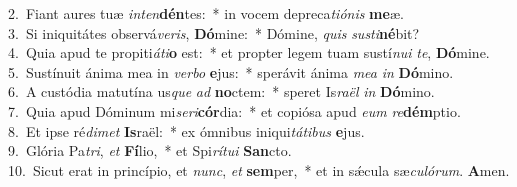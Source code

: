 {2.~}Fiant aures tuæ \textit{in}\textit{ten}\textbf{dén}tes:~* in vocem depreca\textit{ti}\textit{ó}\textit{nis} \textbf{me}æ.\\
{3.~}Si iniquitátes observá\textit{ve}\textit{ris}, \textbf{Dó}mine:~* Dómine, \textit{quis} \textit{su}\textit{sti}\textbf{né}bit?\\
{4.~}Quia apud te propiti\textit{á}\textit{ti}\textbf{o} est:~* et propter legem tuam sustí\textit{nu}\textit{i} \textit{te}, \textbf{Dó}mine.\\
{5.~}Sustínuit ánima mea in \textit{ver}\textit{bo} \textbf{e}jus:~* sperávit ánima \textit{me}\textit{a} \textit{in} \textbf{Dó}mino.\\
{6.~}A custódia matutína us\textit{que} \textit{ad} \textbf{no}ctem:~* speret Is\textit{ra}\textit{ël} \textit{in} \textbf{Dó}mino.\\
{7.~}Quia apud Dóminum mi\textit{se}\textit{ri}\textbf{cór}dia:~* et copiósa apud \textit{e}\textit{um} \textit{re}\textbf{dém}ptio.\\
{8.~}Et ipse ré\textit{di}\textit{met} \textbf{Is}raël:~* ex ómnibus iniqui\textit{tá}\textit{ti}\textit{bus} \textbf{e}jus.\\
{9.~}Glória Pa\textit{tri}, \textit{et} \textbf{Fí}lio,~* et Spi\textit{rí}\textit{tu}\textit{i} \textbf{San}cto.\\
{10.~}Sicut erat in princípio, et \textit{nunc}, \textit{et} \textbf{sem}per,~* et in sǽcula sæ\textit{cu}\textit{ló}\textit{rum}. \textbf{A}men.\\
